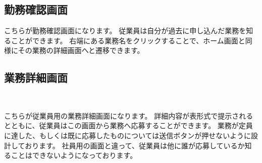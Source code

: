 \documentclass[11pt, a4paper]{jarticle}
\begin{document}
	\subsection{勤務確認画面}
		\begin{figure}[htbp]
			\centering
		\end{figure}
		こちらが勤務確認画面になります。
		従業員は自分が過去に申し込んだ業務を知ることができます。
		右端にある業務名をクリックすることで、ホーム画面と同様にその業務の詳細画面へと遷移できます。
		\clearpage

	\subsection{業務詳細画面}
		\begin{figure}[htbp]
			\begin{minipage}[b]{\linewidth}
				\centering
			\end{minipage} \\
			\begin{minipage}[b]{\linewidth}
				\centering
			\end{minipage}
		\end{figure}
		こちらが従業員用の業務詳細画面になります。
		詳細内容が表形式で提示されるとともに、従業員はこの画面から業務へ応募することができます。
		業務が定員に達した、もしくは既に応募したものについては送信ボタンが押せないように設計しております。
		社員用の画面と違って、従業員は他に誰が応募しているか知ることはできないようになっております。
		\clearpage
\end{document}
